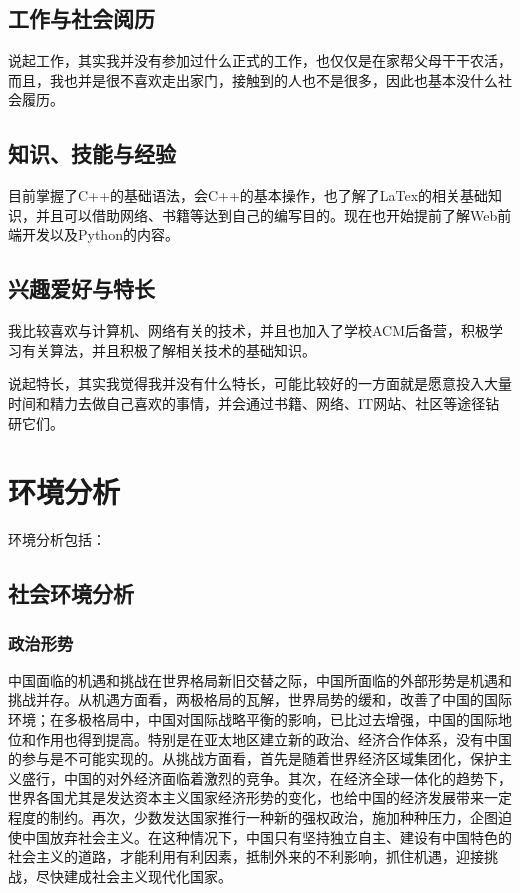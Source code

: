 \documentclass{article}
\begin{document}
\subsection{工作与社会阅历}
\par
说起工作，其实我并没有参加过什么正式的工作，也仅仅是在家帮父母干干农活，而且，我也并是很不喜欢走出家门，接触到的人也不是很多，因此也基本没什么社会履历。
\subsection{知识、技能与经验}
\par
目前掌握了C++的基础语法，会C++的基本操作，也了解了LaTex的相关基础知识，并且可以借助网络、书籍等达到自己的编写目的。现在也开始提前了解Web前端开发以及Python的内容。
\subsection{兴趣爱好与特长}
\par
我比较喜欢与计算机、网络有关的技术，并且也加入了学校ACM后备营，积极学习有关算法，并且积极了解相关技术的基础知识。\par
说起特长，其实我觉得我并没有什么特长，可能比较好的一方面就是愿意投入大量时间和精力去做自己喜欢的事情，并会通过书籍、网络、IT网站、社区等途径钻研它们。
\section{环境分析}
环境分析包括：\par
\subsection{社会环境分析}
\subsubsection{政治形势}
中国面临的机遇和挑战在世界格局新旧交替之际，中国所面临的外部形势是机遇和挑战并存。从机遇方面看，两极格局的瓦解，世界局势的缓和，改善了中国的国际环境；在多极格局中，中国对国际战略平衡的影响，已比过去增强，中国的国际地位和作用也得到提高。特别是在亚太地区建立新的政治、经济合作体系，没有中国的参与是不可能实现的。从挑战方面看，首先是随着世界经济区域集团化，保护主义盛行，中国的对外经济面临着激烈的竞争。其次，在经济全球一体化的趋势下，世界各国尤其是发达资本主义国家经济形势的变化，也给中国的经济发展带来一定程度的制约。再次，少数发达国家推行一种新的强权政治，施加种种压力，企图迫使中国放弃社会主义。在这种情况下，中国只有坚持独立自主、建设有中国特色的社会主义的道路，才能利用有利因素，抵制外来的不利影响，抓住机遇，迎接挑战，尽快建成社会主义现代化国家。\par
\end{document}
